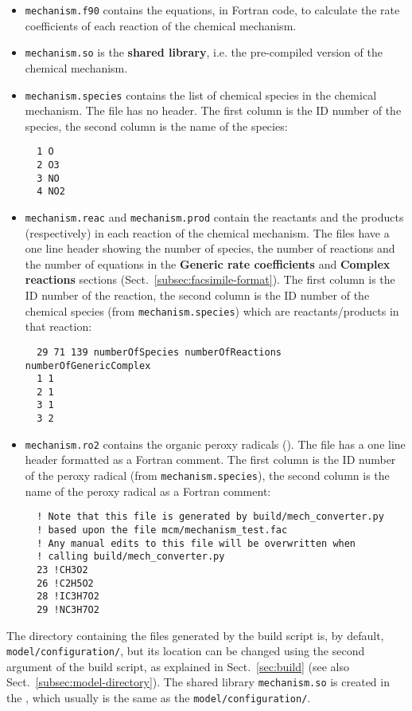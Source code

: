 \begin{itemize}
\item \texttt{mechanism.f90} contains the equations, in Fortran code,
  to calculate the rate coefficients of each reaction of the chemical
  mechanism.
\item \texttt{mechanism.so} is the \textbf{shared library}, i.e. the
  pre-compiled version of the chemical mechanism.
\item \texttt{mechanism.species} contains the list of chemical species
  in the chemical mechanism. The file has no header. The first column
  is the ID number of the species, the second column is the
  name of the species:
  \begin{verbatim}
  1 O
  2 O3
  3 NO
  4 NO2
  \end{verbatim}
\item \texttt{mechanism.reac} and \texttt{mechanism.prod} contain the
  reactants and the products (respectively) in each reaction of the
  chemical mechanism. The files have a one line header showing the
  number of species, the number of reactions and the number of
  equations in the \textbf{Generic rate coefficients} and
  \textbf{Complex reactions} sections (Sect.~\ref{subsec:facsimile-format}).
  The first column is the ID number of the reaction, the second
  column is the ID number of the chemical species (from
  \texttt{mechanism.species}) which are reactants/products in that
  reaction:
  \begin{verbatim}
  29 71 139 numberOfSpecies numberOfReactions numberOfGenericComplex
  1 1
  2 1
  3 1
  3 2
\end{verbatim}
\item \texttt{mechanism.ro2} contains the organic peroxy radicals
  (). The file has a one line header formatted as a Fortran
  comment. The first column is the ID number of the peroxy
  radical (from \texttt{mechanism.species}), the second column is the
  name of the peroxy radical as a Fortran comment:
  \begin{verbatim}
  ! Note that this file is generated by build/mech_converter.py
  ! based upon the file mcm/mechanism_test.fac
  ! Any manual edits to this file will be overwritten when
  ! calling build/mech_converter.py
  23 !CH3O2
  26 !C2H5O2
  28 !IC3H7O2
  29 !NC3H7O2
  \end{verbatim}
\end{itemize}

The directory containing the files generated by the build script is,
by default, \texttt{model/configuration/}, but its location can be
changed using the second argument of the build script, as explained in
Sect.~\ref{sec:build} (see also Sect.~\ref{subsec:model-directory}).
The shared library \texttt{mechanism.so} is created in the \sharedir,
which usually is the same as the \texttt{model/configuration/}.

